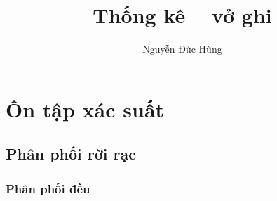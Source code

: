 \documentclass[a4paper,11pt]{article}
\title{Thống kê -- vở ghi}
\author{Nguyễn Đức Hùng}
\date{}
\begin{document}
\maketitle
\chapter{Ôn tập xác suất}
\section{Phân phối rời rạc}
\subsection{Phân phối đều}
\end{document}

